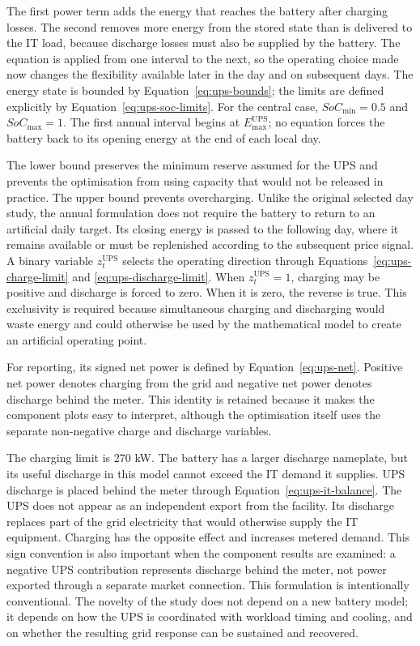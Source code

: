 The first power term adds the energy that reaches the battery after charging
losses. The second removes more energy from the stored state than is delivered
to the IT load, because discharge losses must also be supplied by the battery.
The equation is applied from one interval to the next, so the operating choice
made now changes the flexibility available later in the day and on subsequent
days.
The energy state is bounded by Equation~\eqref{eq:ups-bounds}; the limits are
defined explicitly by Equation~\eqref{eq:ups-soc-limits}.
For the central case, $SoC_{\min}=0.5$ and $SoC_{\max}=1$. The first annual
interval begins at $E_{\max}^{\mathrm{UPS}}$; no equation forces the battery
back to its opening energy at the end of each local day.

The lower bound preserves the minimum reserve assumed for the UPS and prevents
the optimisation from using capacity that would not be released in practice.
The upper bound prevents overcharging. Unlike the original selected day study,
the annual formulation does not require the battery to return to an artificial
daily target. Its closing energy is passed to the following day, where it remains
available or must be replenished according to the subsequent price signal.
A binary variable $z_t^{\mathrm{UPS}}$ selects the operating direction through
Equations~\eqref{eq:ups-charge-limit} and \eqref{eq:ups-discharge-limit}.
When $z_t^{\mathrm{UPS}}=1$, charging may be positive and discharge is forced to
zero. When it is zero, the reverse is true. This exclusivity is required because
simultaneous charging and discharging would waste energy and could otherwise be
used by the mathematical model to create an artificial operating point.

For reporting, its signed net power is defined by Equation~\eqref{eq:ups-net}.
Positive net power denotes charging from the grid and negative net power
denotes discharge behind the meter. This identity is retained because it makes
the component plots easy to interpret, although the optimisation itself uses
the separate non-negative charge and discharge variables.

The charging limit is 270 kW. The battery has a larger discharge nameplate, but
its useful discharge in this model cannot exceed the IT demand it supplies.
UPS discharge is placed behind the meter through
Equation~\eqref{eq:ups-it-balance}.
The UPS does not appear as an independent export from the facility.
Its discharge replaces part of the grid electricity that would otherwise supply
the IT equipment. Charging has the opposite effect and increases metered demand.
This sign convention is also important when the component results are examined:
a negative UPS contribution represents discharge behind the meter, not power
exported through a separate market connection.
This formulation is intentionally conventional. The novelty of the study does
not depend on a new battery model; it depends on how the UPS is coordinated with
workload timing and cooling, and on whether the resulting grid response can be
sustained and recovered.


